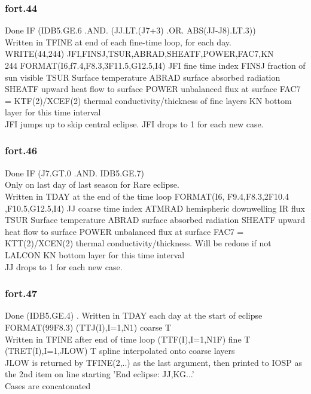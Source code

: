 \documentclass{article}
\begin{document}
\subsubsection{fort.44}
Done IF (IDB5.GE.6 .AND. (JJ.LT.(J7+3)  .OR. ABS(JJ-J8).LT.3))
\\ Written in TFINE at end of each fine-time loop, for each day.
\\ WRITE(44,244) JFI,FINSJ,TSUR,ABRAD,SHEATF,POWER,FAC7,KN 
 \\ 244      FORMAT(I6,f7.4,F8.3,3F11.5,G12.5,I4)
\qi JFI fine time index
\qi FINSJ fraction of sun visible
\qi TSUR  Surface temperature
\qi ABRAD surface absorbed radiation
\qi SHEATF upward heat flow to surface
\qi POWER  unbalanced flux at surface
\qi FAC7 = KTF(2)/XCEF(2)  thermal conductivity/thickness of fine layers 
\qi KN bottom layer for this time interval
\\  JFI jumps up to skip central eclipse. JFI drops to 1 for each new case. 

\subsubsection{fort.46}
Done IF (J7.GT.0 .AND. IDB5.GE.7) 
\\ Only on last day of last season for Rare eclipse.
\\ Written in TDAY at the end of the time loop 
\qiii FORMAT(I6,  F9.4,F8.3,2F10.4      ,F10.5,G12.5,I4) 
\qi JJ  coarse time index
\qi ATMRAD  hemispheric downwelling IR flux
\qi TSUR Surface temperature 
\qi ABRAD surface absorbed radiation
\qi SHEATF  upward heat flow to surface
\qi POWER  unbalanced flux at surface
\qi FAC7 = KTT(2)/XCEN(2)  thermal conductivity/thickness. Will be redone if not LALCON
\qi KN  bottom layer for this time interval
\\ JJ drops to 1 for each new case.

\subsubsection{fort.47}
Done (IDB5.GE.4) . Written in TDAY each day at the start of eclipse
   FORMAT(99F8.3)
\qi (TTJ(I),I=1,N1)  coarse  T 
\\ Written in TFINE after end of time loop
\qi (TTF(I),I=1,N1F)  fine  T
\qi (TRET(I),I=1,JLOW)  T spline interpolated onto coarse layers
\\ JLOW is returned by TFINE(2,..) as the last argument, then printed to IOSP
as the 2nd item on line starting 'End eclipse: JJ,KG...'
\\ Cases are concatonated
\end{document}
